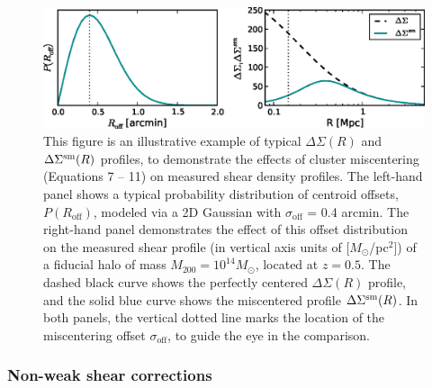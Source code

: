 \begin{figure}
\begin{center}
  \includegraphics[scale=1.0]{plots_ch4/PofRc_DeltaSigma_example.eps}
  \caption[Example of Miscentering Effect on Shear Profile]{This figure is an illustrative example of typical $\Delta\Sigma(R)$ and $\Delta\Sigma^{\rm sm}(R)$ profiles, to demonstrate the effects of cluster miscentering (Equations 7 -- 11) on measured shear density profiles. The left-hand panel shows a typical probability distribution of centroid offsets, $P(R_{\mathrm{off}})$, modeled via a 2D Gaussian with $\sigma_{\mathrm{off}}$ = 0.4 arcmin. The right-hand panel demonstrates the effect of this offset distribution on the measured shear profile (in vertical axis units of [$M_{\odot}$/pc$^2$]) of a fiducial halo of mass $M_{200}=10^{14} M_{\odot}$, located at $z=0.5$. The dashed black curve shows the perfectly centered $\Delta\Sigma(R)$ profile, and the solid blue curve shows the miscentered profile $\Delta\Sigma^{\rm sm}(R)$. In both panels, the vertical dotted line marks the location of the miscentering offset $\sigma_{\mathrm{off}}$, to guide the eye in the comparison.}
\label{plot:miscentering}
\end{center}
\end{figure}


\subsubsection{Non-weak shear corrections}

